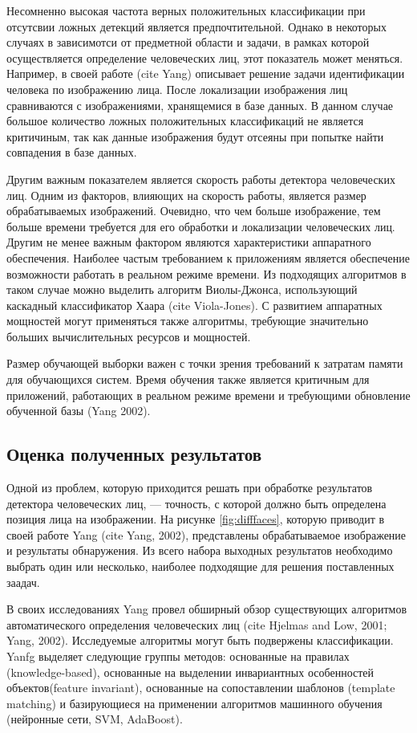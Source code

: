 Несомненно высокая частота верных положительных классификации при отсутсвии ложных детекций является предпочтительной. Однако в некоторых случаях в зависимотси от предметной области и задачи, в рамках которой осуществляется определение человеческих лиц, этот показатель может меняться. Например, в своей работе (cite Yang) описывает решение задачи идентификации человека по изображению лица. После локализации изображения лиц сравниваются с изображениями, хранящемися в базе данных. В данном случае большое количество ложных положительных классификаций не является критичиным, так как данные изображения будут отсеяны при попытке найти совпадения в базе данных.

Другим важным показателем является скорость работы детектора человеческих лиц. Одним из факторов, влияющих на скорость работы, является размер обрабатываемых изображений. Очевидно, что чем больше изображение, тем больше времени требуется для его обработки и локализации человеческих лиц. Другим не менее важным фактором являются характеристики аппаратного обеспечения. Наиболее частым требованием к приложениям является обеспечение возможности работать в реальном режиме времени. Из подходящих алгоритмов в таком случае можно выделить алгоритм Виолы-Джонса, использующий каскадный классификатор Хаара (cite Viola-Jones). С развитием аппаратных мощностей могут применяться также алгоритмы, требующие значительно больших вычислительных ресурсов и мощностей.

Размер обучающей выборки важен с точки зрения требований к затратам памяти для обучающихся систем. Время обучения также является критичным для приложений, работающих в реальном режиме времени и требующими обновление обученной базы (Yang 2002).

\subsection{Оценка полученных результатов}
Одной из проблем, которую приходится решать при обработке результатов детектора человеческих лиц, --- точность, с которой должно быть определена позиция лица на изображении. На рисунке \ref{fig:difffaces}, которую приводит в своей работе Yang (cite Yang, 2002), представлены обрабатываемое изображение и результаты обнаружения. Из всего набора выходных результатов необходимо выбрать один или несколько, наиболее подходящие для решения поставленных заадач. 

В своих исследованиях Yang провел обширный обзор существующих алгоритмов автоматического определения человеческих лиц (cite Hjelmas and Low, 2001; Yang, 2002). Исследуемые алгоритмы могут быть подвержены классификации. Yanfg выделяет следующие группы методов: основанные на правилах (knowledge-based), основанные на выделении инвариантных особенностей объектов(feature invariant), основанные на сопоставлении шаблонов (template matching) и базирующиеся на применении алгоритмов машинного обучения (нейронные сети, SVM, AdaBoost).

